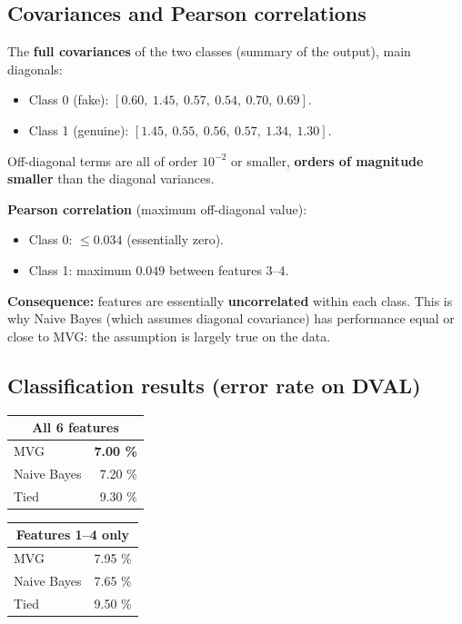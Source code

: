 \documentclass[11pt,a4paper]{article}
\begin{document}
\subsection{Covariances and Pearson correlations}

The \textbf{full covariances} of the two classes (summary of the
output), main diagonals:

\begin{itemize}
\item Class 0 (fake):    $[0.60,\ 1.45,\ 0.57,\ 0.54,\ 0.70,\ 0.69]$.
\item Class 1 (genuine): $[1.45,\ 0.55,\ 0.56,\ 0.57,\ 1.34,\ 1.30]$.
\end{itemize}

Off-diagonal terms are all of order $10^{-2}$ or smaller, \textbf{orders
of magnitude smaller} than the diagonal variances.

\textbf{Pearson correlation} (maximum off-diagonal value):
\begin{itemize}
\item Class 0: $\leq 0.034$ (essentially zero).
\item Class 1: maximum $0.049$ between features 3--4.
\end{itemize}

\textbf{Consequence:} features are essentially \textbf{uncorrelated}
within each class. This is why Naive Bayes (which assumes diagonal
covariance) has performance equal or close to MVG: the assumption is
largely true on the data.

\subsection{Classification results (error rate on DVAL)}

\begin{table}[H]
\centering
\begin{tabular}{lr}
\toprule
\multicolumn{2}{c}{\textbf{All 6 features}} \\
\midrule
MVG          & \textbf{7.00 \%} \\
Naive Bayes  & 7.20 \% \\
Tied         & 9.30 \% \\
\bottomrule
\end{tabular}
\hspace{1em}
\begin{tabular}{lr}
\toprule
\multicolumn{2}{c}{\textbf{Features 1--4 only}} \\
\midrule
MVG          & 7.95 \% \\
Naive Bayes  & 7.65 \% \\
Tied         & 9.50 \% \\
\bottomrule
\end{tabular}
\end{table}
\end{document}

